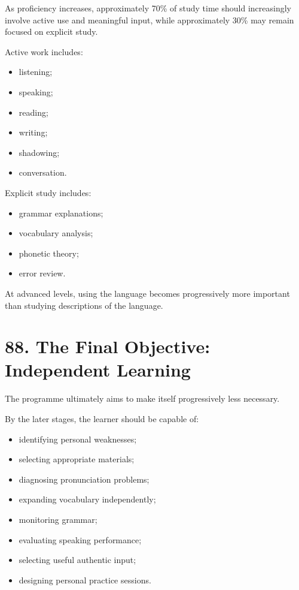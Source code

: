 As proficiency increases, approximately 70\% of study time should increasingly involve active use and meaningful input, while approximately 30\% may remain focused on explicit study.

Active work includes:

\begin{itemize}
    \item listening;
    \item speaking;
    \item reading;
    \item writing;
    \item shadowing;
    \item conversation.
\end{itemize}

Explicit study includes:

\begin{itemize}
    \item grammar explanations;
    \item vocabulary analysis;
    \item phonetic theory;
    \item error review.
\end{itemize}

At advanced levels, using the language becomes progressively more important than studying descriptions of the language.

\section*{88. The Final Objective: Independent Learning}

The programme ultimately aims to make itself progressively less necessary.

By the later stages, the learner should be capable of:

\begin{itemize}
    \item identifying personal weaknesses;
    \item selecting appropriate materials;
    \item diagnosing pronunciation problems;
    \item expanding vocabulary independently;
    \item monitoring grammar;
    \item evaluating speaking performance;
    \item selecting useful authentic input;
    \item designing personal practice sessions.
\end{itemize}

